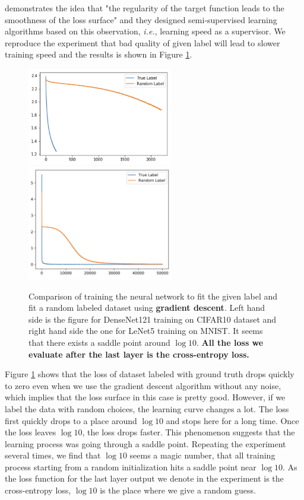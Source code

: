 \documentclass{article}
\theoremstyle{plain}
\theoremstyle{definition}
\begin{document}
\cite{cicek2018saas,cicek2018input} demonstrates the idea that "the regularity of the target function leads to the smoothness of the loss surface" and they designed semi-supervised learning algorithms based on this observation, \emph{i.e.}, learning speed as a supervisor. We reproduce the experiment that bad quality of given label will lead to slower training speed and the results is shown in Figure \ref{saas}.

\begin{figure}[htp]
    \centering
    \includegraphics[width=2.5in]{cifar.jpeg}
    \includegraphics[width=2.5in]{mnist.jpg}
    \caption{Comparison of training the neural network to fit the given label and fit a random labeled dataset using \textbf{gradient descent}. Left hand side is the figure for DenseNet121 training on CIFAR10 dataset and right hand side the one for LeNet5 training on MNIST. It seems that there exists a saddle point around $\log 10$. \textbf{All the loss we evaluate after the last layer is the cross-entropy loss.}}
    \label{saas}
\end{figure}

Figure \ref{saas} shows that the loss of dataset labeled with ground truth drops quickly to zero even when we use the gradient descent algorithm without any noise, which implies that the loss surface in this case is pretty good. However, if we label the data with random choices, the learning curve changes a lot. The loss first quickly drops to a place around $\log 10$ and stops here for a long time. Once the loss leaves $\log 10$, the loss drops faster. This phenomenon suggests that the learning process was going through a saddle point. Repeating the experiment several times, we find that $\log10$ seems a magic number, that all training process starting from a random initialization hits a saddle point near $\log 10$. As the loss function for the last layer output we denote in the experiment is the cross-entropy loss, $\log 10$ is the place where we give a random guess.
\end{document}
